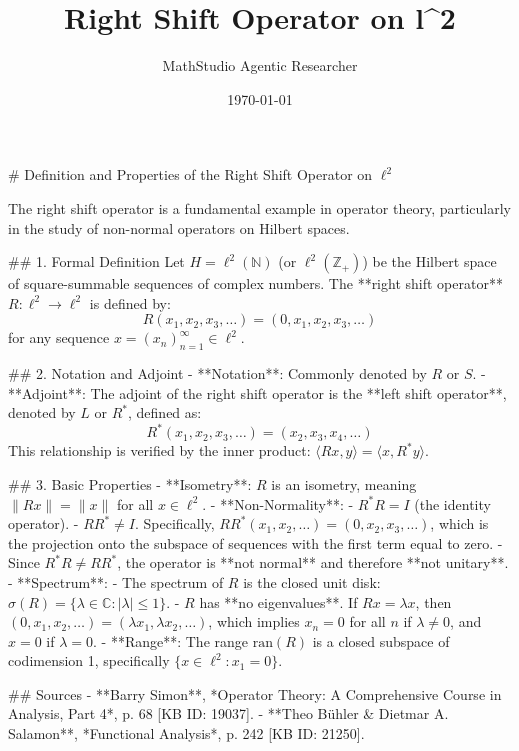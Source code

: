 \documentclass{article}
\title{Right Shift Operator on l^2}
\author{MathStudio Agentic Researcher}
\date{\today}
\begin{document}
\maketitle
# Definition and Properties of the Right Shift Operator on $\ell^2$

The right shift operator is a fundamental example in operator theory, particularly in the study of non-normal operators on Hilbert spaces.

## 1. Formal Definition
Let $H = \ell^2(\mathbb{N})$ (or $\ell^2(\mathbb{Z}_+)$) be the Hilbert space of square-summable sequences of complex numbers. The **right shift operator** $R: \ell^2 \to \ell^2$ is defined by:
$$R(x_1, x_2, x_3, \dots) = (0, x_1, x_2, x_3, \dots)$$
for any sequence $x = (x_n)_{n=1}^\infty \in \ell^2$.

## 2. Notation and Adjoint
- **Notation**: Commonly denoted by $R$ or $S$.
- **Adjoint**: The adjoint of the right shift operator is the **left shift operator**, denoted by $L$ or $R^*$, defined as:
  $$R^*(x_1, x_2, x_3, \dots) = (x_2, x_3, x_4, \dots)$$
  This relationship is verified by the inner product: $\langle Rx, y \rangle = \langle x, R^*y \rangle$.

## 3. Basic Properties
- **Isometry**: $R$ is an isometry, meaning $\|Rx\| = \|x\|$ for all $x \in \ell^2$.
- **Non-Normality**: 
  - $R^*R = I$ (the identity operator).
  - $RR^* \neq I$. Specifically, $RR^*(x_1, x_2, \dots) = (0, x_2, x_3, \dots)$, which is the projection onto the subspace of sequences with the first term equal to zero.
  - Since $R^*R \neq RR^*$, the operator is **not normal** and therefore **not unitary**.
- **Spectrum**:
  - The spectrum of $R$ is the closed unit disk: $\sigma(R) = \{ \lambda \in \mathbb{C} : |\lambda| \le 1 \}$.
  - $R$ has **no eigenvalues**. If $Rx = \lambda x$, then $(0, x_1, x_2, \dots) = (\lambda x_1, \lambda x_2, \dots)$, which implies $x_n = 0$ for all $n$ if $\lambda \neq 0$, and $x=0$ if $\lambda=0$.
- **Range**: The range $\text{ran}(R)$ is a closed subspace of codimension 1, specifically $\{x \in \ell^2 : x_1 = 0\}$.

## Sources
- **Barry Simon**, *Operator Theory: A Comprehensive Course in Analysis, Part 4*, p. 68 [KB ID: 19037].
- **Theo Bühler & Dietmar A. Salamon**, *Functional Analysis*, p. 242 [KB ID: 21250].
\end{document}
